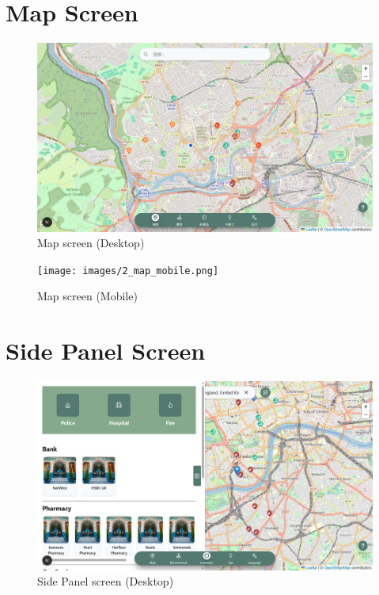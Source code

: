 \section{Map Screen}
\begin{figure}[H]
    \centering
    \includegraphics[height=0.3\textheight,keepaspectratio]{images/2_map_desktop.png}
    \caption{Map screen (Desktop)}
\end{figure}

\begin{figure}[H]
    \centering
    \texttt{[image: images/2\_map\_mobile.png]}
    \caption{Map screen (Mobile)}
\end{figure}

\section{Side Panel Screen}
\begin{figure}[H]
    \centering
    \includegraphics[height=0.3\textheight,keepaspectratio]{images/3_sidepanel_desktop.png}
    \caption{Side Panel screen (Desktop)}
\end{figure}

